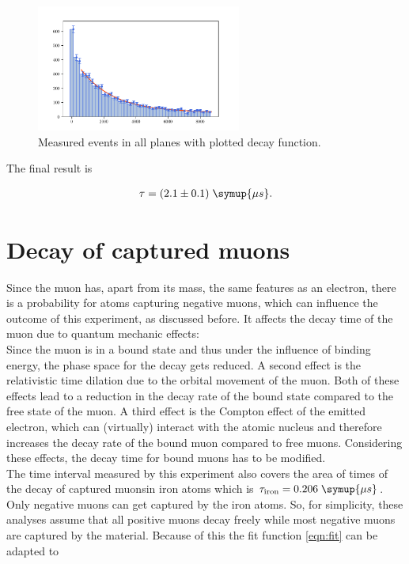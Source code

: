 

\begin{figure}
    \centering
    \includegraphics[width=0.6\textwidth]{plots/pALL.pdf}
    \caption{Measured events in all planes with plotted decay function.}
    \label{fig:pALL}
\end{figure}

The final result is 

\begin{align*}
    \tau = (2.1 \pm 0.1) \; \symup{\mu s}.
\end{align*} 

\section{Decay of captured muons}

\label{sec:muoncapture}

Since the muon has, apart from its mass, the same features as an electron, there is a probability for atoms capturing negative muons, which can influence the outcome of this experiment, as discussed before. It affects the decay time of the muon due to quantum mechanic effects: \\
Since the muon is in a bound state and thus under the influence of binding energy, the phase space for the decay gets reduced. A second effect is the relativistic time dilation due to the orbital movement of the muon. Both of these effects lead to a reduction in the decay rate of the bound state compared to the free state of the muon. A third effect is the Compton effect of the emitted electron, which can (virtually) interact with the atomic nucleus and therefore increases the decay rate of the bound muon compared to free muons. Considering these effects, the decay time for bound muons has to be modified\cite{bound}.\\

The time interval measured by this experiment also covers the area of times of the decay of captured muonsin iron atoms which is $\tau_{\text{iron}} = 0.206 \; \symup{\mu s}$.
Only negative muons can get captured by the iron atoms. So, for simplicity, these analyses assume that all positive muons decay freely while most negative muons are captured by the material.
Because of this the fit function \ref{eqn:fit} can be adapted to 

